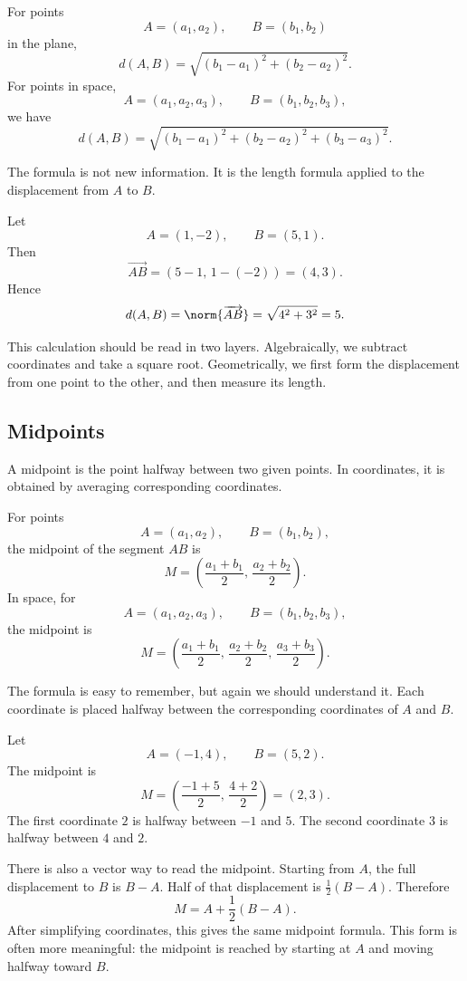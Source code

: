 \begin{definitionbox}
For points
\[
A=(a_1,a_2),
\qquad
B=(b_1,b_2)
\]
in the plane,
\[
d(A,B)=\sqrt{(b_1-a_1)^2+(b_2-a_2)^2}.
\]
For points in space,
\[
A=(a_1,a_2,a_3),
\qquad
B=(b_1,b_2,b_3),
\]
we have
\[
d(A,B)=\sqrt{(b_1-a_1)^2+(b_2-a_2)^2+(b_3-a_3)^2}.
\]
\end{definitionbox}

The formula is not new information. It is the length formula applied to the displacement from \(A\) to \(B\).

\begin{examplebox}
Let
\[
A=(1,-2),
\qquad
B=(5,1).
\]
Then
\[
\overrightarrow{AB}=(5-1,\,1-(-2))=(4,3).
\]
Hence
\[
d(A,B)=\norm{\overrightarrow{AB}}=\sqrt{4^2+3^2}=5.
\]
\end{examplebox}

This calculation should be read in two layers. Algebraically, we subtract coordinates and take a square root. Geometrically, we first form the displacement from one point to the other, and then measure its length.

\subsection*{Midpoints}

A midpoint is the point halfway between two given points. In coordinates, it is obtained by averaging corresponding coordinates.

\begin{definitionbox}
For points
\[
A=(a_1,a_2),
\qquad
B=(b_1,b_2),
\]
the midpoint of the segment \(AB\) is
\[
M=\left(\frac{a_1+b_1}{2},\,\frac{a_2+b_2}{2}\right).
\]
In space, for
\[
A=(a_1,a_2,a_3),
\qquad
B=(b_1,b_2,b_3),
\]
the midpoint is
\[
M=\left(\frac{a_1+b_1}{2},\,\frac{a_2+b_2}{2},\,\frac{a_3+b_3}{2}\right).
\]
\end{definitionbox}

The formula is easy to remember, but again we should understand it. Each coordinate is placed halfway between the corresponding coordinates of \(A\) and \(B\).

\begin{examplebox}
Let
\[
A=(-1,4),
\qquad
B=(5,2).
\]
The midpoint is
\[
M=\left(\frac{-1+5}{2},\,\frac{4+2}{2}\right)=(2,3).
\]
The first coordinate \(2\) is halfway between \(-1\) and \(5\). The second coordinate \(3\) is halfway between \(4\) and \(2\).
\end{examplebox}

There is also a vector way to read the midpoint. Starting from \(A\), the full displacement to \(B\) is \(B-A\). Half of that displacement is \(\frac12(B-A)\). Therefore
\[
M=A+\frac12(B-A).
\]
After simplifying coordinates, this gives the same midpoint formula. This form is often more meaningful: the midpoint is reached by starting at \(A\) and moving halfway toward \(B\).

